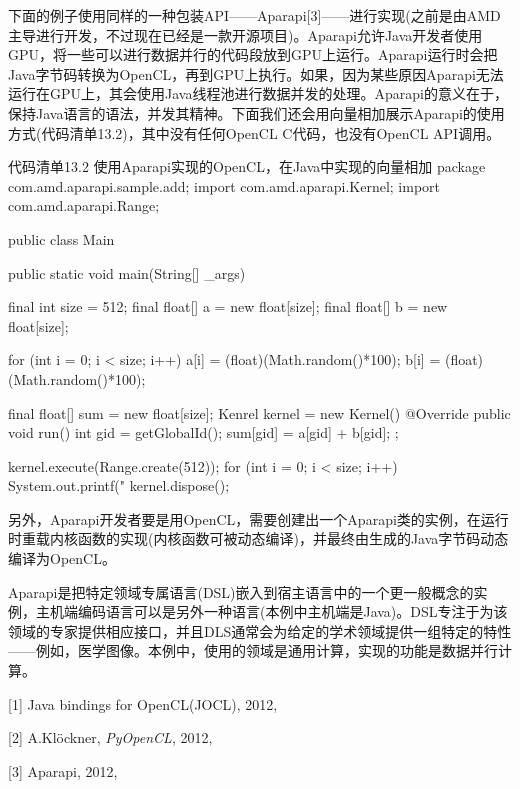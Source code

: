 下面的例子使用同样的一种包装API——Aparapi[3]——进行实现(之前是由AMD主导进行开发，不过现在已经是一款开源项目)。Aparapi允许Java开发者使用GPU，将一些可以进行数据并行的代码段放到GPU上运行。Aparapi运行时会把Java字节码转换为OpenCL，再到GPU上执行。如果，因为某些原因Aparapi无法运行在GPU上，其会使用Java线程池进行数据并发的处理。Aparapi的意义在于，保持Java语言的语法，并发其精神。下面我们还会用向量相加展示Aparapi的使用方式(代码清单13.2)，其中没有任何OpenCL C代码，也没有OpenCL API调用。

\begin{codeboxt}[java]{代码清单13.2 使用Aparapi实现的OpenCL，在Java中实现的向量相加}
package com.amd.aparapi.sample.add;
import com.amd.aparapi.Kernel;
import com.amd.aparapi.Range;

public class Main{
  public static void main(String[] _args){
    final int size = 512;
    final float[] a = new float[size];
    final float[] b = new float[size];

    for (int i = 0; i < size; i++){
      a[i] = (float)(Math.random()*100);
      b[i] = (float)(Math.random()*100);
    }

    final float[] sum = new float[size];
    Kenrel kernel = new Kernel(){
      @Override public void run(){
        int gid = getGlobalId();
        sum[gid] = a[gid] + b[gid];
      }
    };

    kernel.execute(Range.create(512));
    for (int i = 0; i < size; i++){
      System.out.printf("%
    }
    kernel.dispose();
  }
}
\end{codeboxt}

另外，Aparapi开发者要是用OpenCL，需要创建出一个Aparapi类的实例，在运行时重载内核函数的实现(内核函数可被动态编译)，并最终由生成的Java字节码动态编译为OpenCL。

Aparapi是把特定领域专属语言(DSL)嵌入到宿主语言中的一个更一般概念的实例，主机端编码语言可以是另外一种语言(本例中主机端是Java)。DSL专注于为该领域的专家提供相应接口，并且DLS通常会为给定的学术领域提供一组特定的特性——例如，医学图像。本例中，使用的领域是通用计算，实现的功能是数据并行计算。

\myRefRule

\begin{myRefs}

[1] Java bindings for OpenCL(JOCL), 2012, 

[2] A.Klöckner, \emph{PyOpenCL}, 2012, 

[3] Aparapi, 2012, 

\end{myRefs}



